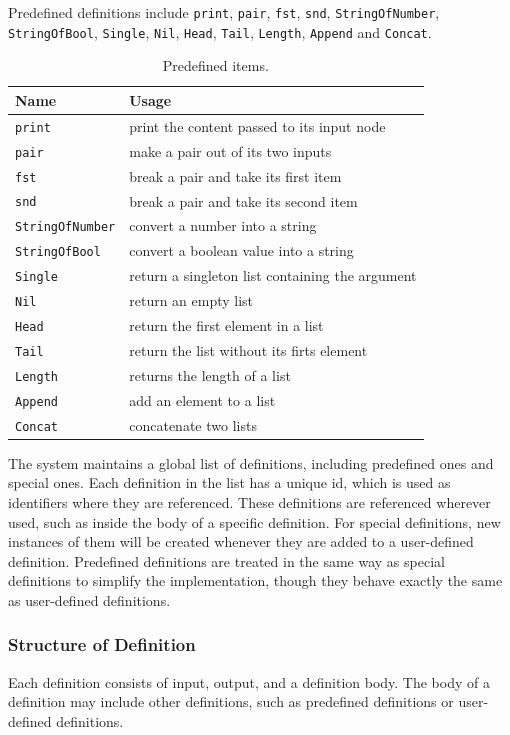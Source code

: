 \documentclass[12pt,UTF8,a4]{article}
\newcommand{\code}[1]{\texttt{#1}}
\begin{document}
Predefined definitions include \code{print}, \code{pair}, \code{fst},
\code{snd}, \code{StringOfNumber}, \code{StringOfBool}, \code{Single},
\code{Nil}, \code{Head}, \code{Tail}, \code{Length}, \code{Append} and
\code{Concat}.
\begin{table}[!ht]
\center
\begin{tabular}{l|l}
\hline
Name & Usage \\
\hline
\code{print} & print the content passed to its input node\\
\code{pair} & make a pair out of its two inputs\\
\code{fst} & break a pair and take its first item \\
\code{snd} & break a pair and take its second item \\
\code{StringOfNumber} & convert a number into a string\\
\code{StringOfBool} & convert a boolean value into a string \\
\code{Single} & return a singleton list containing the argument \\
\code{Nil} & return an empty list \\
\code{Head} & return the first element in a list\\
\code{Tail} & return the list without its firts element\\
\code{Length} & returns the length of a list\\
\code{Append} & add an element to a list \\
\code{Concat} & concatenate two lists \\
\hline
\end{tabular}
\caption{Predefined items.}\label{tab:pitems}
\end{table}

The system maintains a global list of definitions, including predefined ones and special ones. Each definition in the list has a unique id, which is used as identifiers where they are referenced. These definitions are referenced wherever used, such as inside the body of a specific definition. For special definitions, new instances of them will be created whenever they are added to a user-defined definition. Predefined definitions are treated in the same way as special definitions to simplify the implementation, though they behave exactly the same as user-defined definitions.

\subsubsection{Structure of Definition}
Each definition consists of input, output, and a definition body. The body of a definition may include other definitions, such as predefined definitions or user-defined definitions.
\end{document}
